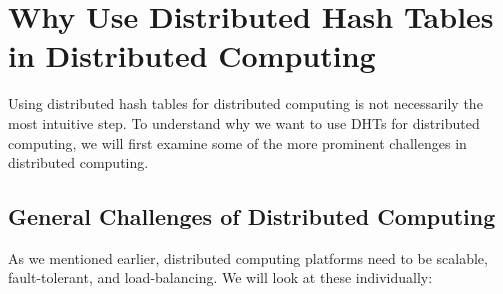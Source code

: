 \section{Why Use Distributed Hash Tables in Distributed Computing}

Using distributed hash tables for distributed computing is not necessarily the most intuitive step.
To understand why we want to use DHTs for distributed computing, we will first examine some of the more prominent challenges in distributed computing.

\subsection{General Challenges of Distributed Computing}
\label{sec:challenges}

As we mentioned earlier, distributed computing platforms need to be scalable, fault-tolerant, and load-balancing.
We will look at these individually:


